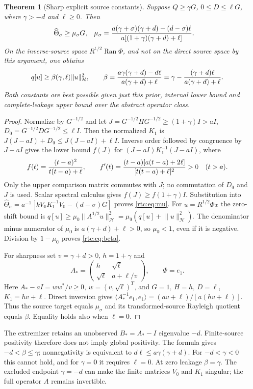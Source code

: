 \documentclass[11pt,a4paper]{article}
\numberwithin{equation}{section}
\newtheorem{theorem}{Theorem}[section]
\theoremstyle{definition}\newtheorem{definition}[theorem]{Definition}
\theoremstyle{remark}\newtheorem{remark}[theorem]{Remark}
\newcommand{\Hh}{\mathcal H}\newcommand{\Hw}{\mathcal H}
\newcommand{\ip}[2]{\langle#1,#2\rangle}\newcommand{\norm}[1]{\lVert#1\rVert}\newcommand{\abs}[1]{\lvert#1\rvert}
\begin{document}
\begin{theorem}[Sharp explicit source constants]\label{rtc:thm:scalar}
Suppose $Q\ge\gamma G$, $0\le D\le\ell G$, where
$\gamma>-d$ and $\ell\ge0$. Then
\begin{align}\label{rtc:eq:mu}
 \widehat\Theta_\sigma&\ge\mu_\sigma G,&
 \mu_\sigma&={a(\gamma+\sigma)(\gamma+d)-(d-\sigma)\ell
                  \over a[(1+\gamma)(\gamma+d)+\ell]}.
\end{align}
On the inverse-source space $R^{1/2}\operatorname{Ran}\Phi$, and not
on the direct source space by this argument, one obtains
\begin{equation}\label{rtc:eq:beta}
 q[u]\ge\beta(\gamma,\ell)\norm u_{\Hh}^2,\qquad
 \beta={a\gamma(\gamma+d)-d\ell\over a(\gamma+d)+\ell}
       =\gamma-{(\gamma+d)\ell\over a(\gamma+d)+\ell}.
\end{equation}
Both constants are best possible given just this prior, internal lower
bound and complete-leakage upper bound over the abstract operator class.
\end{theorem}
\begin{proof}
Normalize by $G^{-1/2}$ and let
$J=G^{-1/2}HG^{-1/2}\ge(1+\gamma)I>aI$,
$D_0=G^{-1/2}DG^{-1/2}\le\ell I$.
Then the normalized $K_1$ is
$J(J-aI)+D_0\le J(J-aI)+\ell I$.
Inverse order followed by congruence by $J-aI$ gives the lower bound
$f(J)$ for $(J-aI)K_1^{-1}(J-aI)$, where
\[
 f(t)={(t-a)^2\over t(t-a)+\ell},\qquad
 f'(t)={(t-a)[a(t-a)+2\ell]\over[t(t-a)+\ell]^2}>0\quad(t>a).
\]
Only the upper comparison matrix commutes with $J$; no commutation of
$D_0$ and $J$ is used. Scalar spectral calculus gives
$f(J)\ge f(1+\gamma)I$. Substitution into
$\widehat\Theta_\sigma=a^{-1}[kV_0K_1^{-1}V_0-(d-\sigma)G]$
proves \eqref{rtc:eq:mu}.
For $u=R^{1/2}\Phi x$ the zero-shift bound is
$q[u]\ge\mu_0\norm{A^{1/2}u}_{\Hh}^2
=\mu_0(q[u]+\norm u_{\Hh}^2)$.
The denominator minus numerator of $\mu_0$ is
$a(\gamma+d)+\ell>0$, so $\mu_0<1$, even if it is negative.
Division by $1-\mu_0$ proves \eqref{rtc:eq:beta}.

For sharpness set $v=\gamma+d>0$, $h=1+\gamma$ and
\[
 A_* =\begin{pmatrix}h&\sqrt\ell\\\sqrt\ell&a+\ell/v\end{pmatrix},
 \qquad \Phi=e_1.
\]
Here $A_*-aI=ww^*/v\ge0$, $w=(v,\sqrt\ell)^T$,
and $G=1$, $H=h$, $D=\ell$, $K_1=hv+\ell$.
Direct inversion gives
$\ip{A_*^{-1}e_1}{e_1}=(av+\ell)/[a(hv+\ell)]$.
Thus the source target equals $\mu_\sigma$ and its transformed-source
Rayleigh quotient equals $\beta$. Equality holds also when $\ell=0$.
\end{proof}
The extremizer retains an unobserved $B_*=A_*-I$ eigenvalue $-d$.
Finite-source positivity therefore does not imply global positivity.
The formula gives $-d<\beta\le\gamma$;
nonnegativity is equivalent to $d\ell\le a\gamma(\gamma+d)$.
For $-d<\gamma<0$ this cannot hold, and for $\gamma=0$ it requires
$\ell=0$. At zero leakage $\beta=\gamma$.
The excluded endpoint $\gamma=-d$ can make the finite matrices $V_0$
and $K_1$ singular; the full operator $A$ remains invertible.
\end{document}
